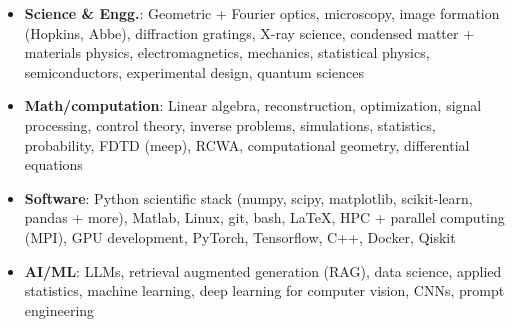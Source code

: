 \begin{itemize}
    \item \textbf{Science \& Engg.}: Geometric + Fourier optics, microscopy, image formation (Hopkins, Abbe), diffraction gratings, X-ray science, condensed matter + materials physics, electromagnetics, mechanics, statistical physics, semiconductors, experimental design, quantum sciences \par
    \item \textbf{Math/computation}: Linear algebra, reconstruction, optimization, signal processing, control theory, inverse problems, simulations, statistics, probability, FDTD (meep), RCWA, computational geometry, differential equations \par
    \item \textbf{Software}: Python scientific stack (numpy, scipy, matplotlib, scikit-learn, pandas + more), Matlab, Linux, git, bash, \LaTeX, HPC + parallel computing (MPI), GPU development, PyTorch, Tensorflow, C++, Docker, Qiskit \par
    \item\textbf{AI/ML}: LLMs, retrieval augmented generation (RAG), data science, applied statistics, machine learning, deep learning for computer vision, CNNs, prompt engineering \par
\end{itemize}
